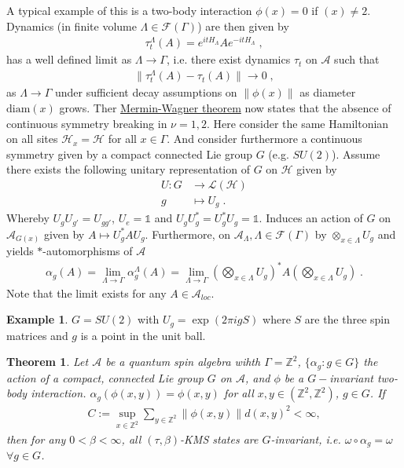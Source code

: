 \documentclass[
a4paper, %
11pt, %
onecolumn, %
openany, %
]{memoir}
\theoremstyle{definition}
\newtheorem{example}{Example}[chapter]
\theoremstyle{remark}
\theoremstyle{plain}
\newtheorem{theorem}{Theorem}[chapter]
\begin{document}
A typical example of this is a two-body interaction $\phi(x)=0$ if $(x)\neq 2$. Dynamics (in finite volume $\Lambda\in\mathcal{F}(\Gamma)$) are then given by \begin{align}
\tau_t^{\Lambda}(A)=e^{itH_{\Lambda}}Ae^{-itH_{\Lambda}}\; ,
\end{align}
has a well defined limit as $\Lambda\rightarrow\Gamma$, i.e. there exist dynamics $\tau_t$ on $\mathcal{A}$ such that \begin{align}
\|\tau_t^{\Lambda}(A)-\tau_t(A)\|\rightarrow 0\; ,
\end{align}
as $\Lambda\rightarrow \Gamma$ under sufficient decay assumptions on $\|\phi(x)\|$ as diameter $\mathrm{diam}(x)$ grows. Ther \underline{Mermin-Wagner theorem} now states that the absence of continuous symmetry breaking in $\nu=1,2$. Here consider the same Hamiltonian on all sites $\mathcal{H}_x=\mathcal{H}$ for all $x\in\Gamma$. And consider furthermore a continuous symmetry given by a compact connected Lie group $G$ (e.g. $SU(2)$). Assume there exists the following unitary representation of $G$ on $\mathcal{H}$ given by \begin{align}
U:G&\longrightarrow \mathcal{L}(\mathcal{H}) \\
g&\longmapsto U_g\; .
\end{align}
Whereby $U_gU_{g'}=U_{gg'}$, $U_{e}=\mathds{1}$ and $U_gU_g^*=U_g^*U_g=\mathds{1}$. Induces an action of $G$ on $\mathcal{A}_{G(x)}$ given by $A\mapsto U_g^*A U_g$. Furthermore, on $\mathcal{A}_{\Lambda}, \Lambda\in\mathcal{F}(\Gamma)$ by $\otimes_{x\in\Lambda}U_g$ and yields $*$-automorphisms of $\mathcal{A}$ \begin{align}
\alpha_g(A)=\lim_{\Lambda\rightarrow\Gamma}\alpha_g^{\Lambda}(A) =\lim_{\Lambda\rightarrow\Gamma} \left(\bigotimes_{x\in\Lambda}U_g\right)^*A\left(\bigotimes_{x\in\Lambda}U_g\right)\; .
\end{align}
Note that the limit exists for any $A\in\mathcal{A}_{loc}$.
\begin{example}
$G=SU(2)$ with $U_g=\exp(2\pi i g S)$ where $S$ are the three spin matrices and $g$ is a point in the unit ball.
\end{example}
\begin{theorem}
Let $\mathcal{A}$ be a quantum spin algebra wihth $\Gamma=\mathbb{Z}^2$, $\{\alpha_g:g\in G\}$ the action of a compact, connected Lie group $G$ on $\mathcal{A}$, and $\phi$ be a $G-$invariant two-body interaction. $\alpha_g(\phi(x,y))=\phi(x,y)$ for all $x,y\in(\mathbb{Z}^2,\mathbb{Z}^2)$, $g\in G$. If \begin{align}
C:=\sup_{x\in\mathbb{Z}^2}\sum_{y\in\mathbb{Z}^2}\|\phi(x,y)\| d(x,y)^2<\infty,
\end{align}
then for any $0<\beta<\infty$, all $(\tau,\beta)$-KMS states are $G$-invariant, i.e. $\omega\circ\alpha_g=\omega$ $\forall g\in G$.
\end{theorem}
\end{document}
